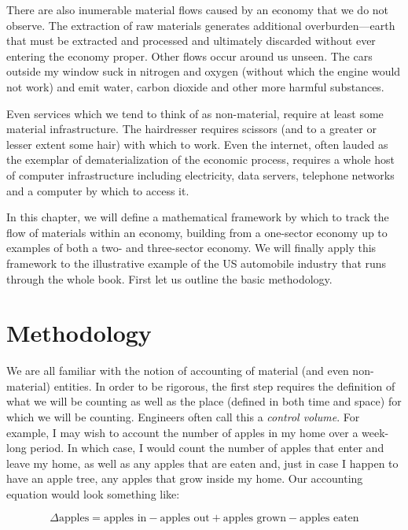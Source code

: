 There are also inumerable material flows caused by an economy that we do not observe.
The extraction of raw materials generates additional overburden---earth that must be
extracted and processed and ultimately discarded without ever entering the economy proper.
Other flows occur around us unseen. The cars outside my window suck in nitrogen and oxygen (without which
the engine would not work) and emit water, carbon dioxide and other more harmful substances. 

Even services which we tend to think of as non-material, require at least some material infrastructure. 
The hairdresser requires scissors (and to a greater or lesser extent some hair) with which to work.
Even the internet, often lauded as the exemplar of dematerialization of the economic process, requires
a whole host of computer infrastructure including electricity, data servers, telephone networks and a
computer by which to access it.

In this chapter, we will define a mathematical framework by which to track the flow of materials
within an economy, building from a one-sector economy up to examples of both a two- and 
three-sector economy. We will finally apply this framework to the illustrative example of the US
automobile industry that runs through the whole book. First let us outline the basic methodology.

\section{Methodology}

We are all familiar with the notion of accounting of material (and even non-material) entities. In order
to be rigorous, the first step requires the definition of what we will be counting as well as the place
(defined in both time and space) for which we will be counting. Engineers often call this a \emph{control volume}.
For example, I may wish to account the number of apples in my home over a week-long period. In which case,
I would count the number of apples that enter  and leave my home, as well as any apples that are eaten and, just 
in case I happen to have an apple tree, any apples that grow inside my home. Our accounting equation would look
something like:

\begin{equation}
	\Delta\textrm{apples} = \textrm{apples in} - \textrm{apples out} + \textrm{apples grown} - \textrm{apples eaten}
\end{equation}

